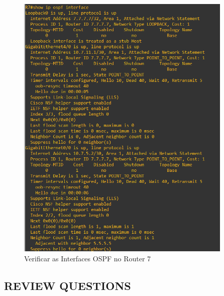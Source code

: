\documentclass[11pt,english, openright, oneside]{book}
\begin{document}
\begin{itemize}
  \begin{figure}[H]
    \centering
    \includegraphics[width=0.92\textwidth]{imagens/Tarefa5/25.ospf_interface_R7.png}
    \caption{Verificar as Interfaces OSPF no Router 7}
    \label{fig:config45}
  \end{figure}
  \vspace{0.2cm}
\end{itemize}

\subsection{REVIEW QUESTIONS}
\vspace{0.2cm}
\end{document}
